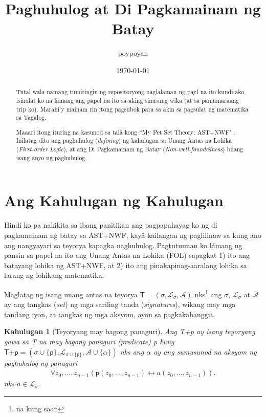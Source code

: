 \documentclass{article}
\title{Paghuhulog at Di Pagkamainam ng Batay}
\author{poypoyan}
\date{\petsa\today}
\newtheorem{definition}{Kahulugan}[section]
\begin{document}
\maketitle

\begin{abstract}
Tutal wala namang tumitingin ng repositoryong naglalaman ng payl na ito kundi ako, isinulat ko na lámang ang papel na ito sa aking sinusung wika (at sa pamamaraang trip ko). Marahi'y mainam rin itong pagsubok para sa akin sa pagsulat ng matematika sa Tagalog.

Maaari itong ituring na kasunod sa talâ kong ``My Pet Set Theory: \textsf{AST+NWF}" \cite{ast-nwf}. Inilatag dito ang paghuhulog (\textit{defining}) ng kahulugan sa Unang Antas na Lohika (\textit{First-order Logic}), at ang Di Pagkamainam ng Batay (\textit{Non-well-foundedness}) bilang isang anyo ng paghuhulog.
\end{abstract}

\section{Ang Kahulugan ng Kahulugan}
Hindi ko pa nakikita sa ibang panitikan ang pagpapahayag ko ng di pagkamainam ng batay sa \textsf{AST+NWF}, kayâ kailangan ng paglilinaw sa kung ano ang nangyayari sa teyorya kapagka naghuhulog. Pagtutuunan ko lámang ng pansin sa papel na ito ang Unang Antas na Lohika (FOL) sapagkat 1) ito ang batayang lohika ng \textsf{AST+NWF}, at 2) ito ang pinakapinag-aaralang lohika sa larang ng lohikang matematika.

Maglatag ng isang unang antas na teyorya $\textsf{T} = (\sigma, \mathcal{L}_\sigma, \mathcal{A})$ nks\footnote{na kung saan} ang $\sigma$, $\mathcal{L}_\sigma$ at $\mathcal{A}$ ay ang tangkas (\textit{set}) ng mga sariling tanda (\textit{signatures}), wikang may mga tandang iyon, at tangkas ng mga aksyom, ayon sa pagkakabanggit.

\begin{definition}[Teyoryang may bagong panaguri]
\label{paghuhulog}
Ang \textsf{T+p} ay isang teyoryang gawa sa \textsf{T} na may bagong panaguri (\textit{predicate}) \textsf{p} kung $\textsf{T+p} = (\sigma \cup \{\textsf{p}\}, \mathcal{L}_{\sigma \cup \{\textsf{p}\}}, \mathcal{A} \cup \{\alpha\})$ nks ang $\alpha$ ay ang sumusunod na aksyom ng paghuhulog ng panaguri
\begin{align}
\forall z_0, \ldots, z_{n-1}(\textsf{p}(z_0, \ldots, z_{n-1}) \leftrightarrow a(z_0, \ldots, z_{n-1})).
\end{align}
nks $a \in \mathcal{L}_\sigma$.
\end{definition}
\end{document}
